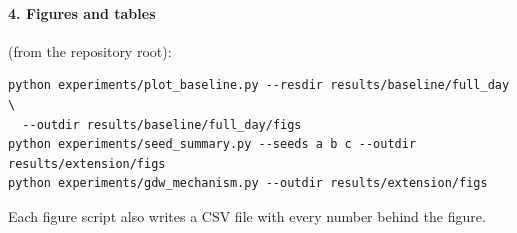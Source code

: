 \documentclass[11pt,a4paper]{article}
\begin{document}
\paragraph{4. Figures and tables} (from the repository root):
\begin{lstlisting}
python experiments/plot_baseline.py --resdir results/baseline/full_day \
  --outdir results/baseline/full_day/figs
python experiments/seed_summary.py --seeds a b c --outdir results/extension/figs
python experiments/gdw_mechanism.py --outdir results/extension/figs
\end{lstlisting}
Each figure script also writes a CSV file with every number behind the figure.
\end{document}
